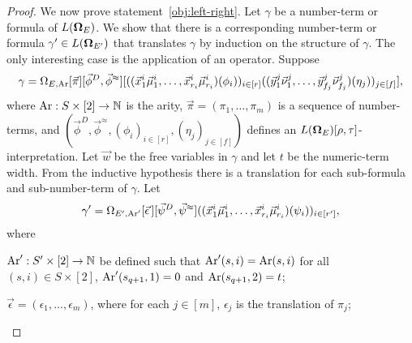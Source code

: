 \documentclass[../main/thesis.tex]{subfiles}
\begin{document}
\begin{proof}


  We now prove statement~\ref{obj:left-right}. Let $\gamma$ be a number-term or
  formula of $L(\mathbf{\mathbf{\Omega}}_{E})$. We show that there is a corresponding number-term
  or formula $\gamma' \in L(\mathbf{\mathbf{\Omega}}_{E'})$ that translates $\gamma$ by induction
  on the structure of $\gamma$. The only interesting case is the application of
  an operator. Suppose
  \begin{align*} \gamma = \Omega_{E, \text{\upshape Ar}} [\vec{\pi}] [\vec{\phi}^D,
    \vec{\phi}^{\approx}] [((\vec{x}^i_1 \vec{\mu}^i_1, \ldots, \vec{x}^i_{r_i}
    \vec{\mu}^i_{r_i})(\phi_i))_{i \in [r]}((\vec{y}^j_1 \vec{\nu}^j_1, \ldots,
    \vec{y}^j_{f_j} \vec{\nu}^j_{f_j})(\eta_j))_{j \in [f]}],
  \end{align*}
  where $\text{\upshape Ar} : S \times [2] \rightarrow \mathbb{N}$ is the arity, $\vec{\pi} = (\pi_1,
  \ldots, \pi_m)$ is a sequence of number-terms, and $(\vec{\phi}^D,
  \vec{\phi}^{\approx}, (\phi_i)_{i \in [r]}, (\eta_j)_{j \in [f]})$ defines an
  $L(\mathbf{\mathbf{\Omega}}_E)[\rho, \tau]$-interpretation. Let $\vec{w}$ be the free variables
  in $\gamma$ and let $t$ be the numeric-term width. From the inductive
  hypothesis there is a translation for each sub-formula and sub-number-term of
  $\gamma$. Let
  \begin{align*}
    \gamma' = \Omega_{E', \text{\upshape Ar}'}[\vec{\epsilon}\,][\vec{\psi}^D, \vec{\psi}^{\approx}] ((\vec{x}^i_1 \vec{\mu}^i_1, \ldots, \vec{x}^i_{r_i} \vec{\mu}^i_{r_i})(\psi_i))_{i \in [r']},
  \end{align*}
  where
  \begin{myitemize}
  \item $\text{\upshape Ar}' : S' \times [2] \rightarrow \mathbb{N}$ be defined such that $\text{\upshape Ar}'(s, i) =
    \text{\upshape Ar}(s,i)$ for all $(s, i) \in S \times [2]$, $\text{\upshape Ar}'(s_{q+1}, 1) = 0$ and
    $\text{\upshape Ar}(s_{q+1}, 2) = t$;
  \item $\vec{\epsilon} = (\epsilon_1, \ldots, \epsilon_m)$, where for each $j
    \in [m]$, $\epsilon_j$ is the translation of $\pi_j$;

\end{myitemize}
\end{proof}
\end{document}
